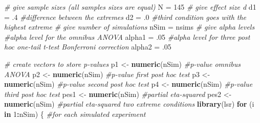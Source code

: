 \documentclass[]{book}
\newenvironment{Shaded}{\begin{snugshade}}{\end{snugshade}}
\newcommand{\CommentTok}[1]{\textcolor[rgb]{0.56,0.35,0.01}{\textit{#1}}}
\newcommand{\ControlFlowTok}[1]{\textcolor[rgb]{0.13,0.29,0.53}{\textbf{#1}}}
\newcommand{\DecValTok}[1]{\textcolor[rgb]{0.00,0.00,0.81}{#1}}
\newcommand{\FloatTok}[1]{\textcolor[rgb]{0.00,0.00,0.81}{#1}}
\newcommand{\KeywordTok}[1]{\textcolor[rgb]{0.13,0.29,0.53}{\textbf{#1}}}
\newcommand{\NormalTok}[1]{#1}
\newcommand{\OperatorTok}[1]{\textcolor[rgb]{0.81,0.36,0.00}{\textbf{#1}}}
\newcommand{\StringTok}[1]{\textcolor[rgb]{0.31,0.60,0.02}{#1}}
\begin{document}
\begin{Shaded}
\begin{Highlighting}[]
\CommentTok{# give sample sizes (all samples sizes are equal)}
\NormalTok{N =}\StringTok{ }\DecValTok{145}
\CommentTok{# give effect size d}
\NormalTok{d1 =}\StringTok{ }\FloatTok{.4} \CommentTok{#difference between the extremes}
\NormalTok{d2 =}\StringTok{ }\FloatTok{.0} \CommentTok{#third condition goes with the highest extreme}
\CommentTok{# give number of simulations}
\NormalTok{nSim =}\StringTok{ }\NormalTok{nsims}
\CommentTok{# give alpha levels}
\CommentTok{#alpha level for the omnibus ANOVA}
\NormalTok{alpha1 =}\StringTok{ }\FloatTok{.05} 
\CommentTok{#alpha level for three post hoc one-tail t-test Bonferroni correction}
\NormalTok{alpha2 =}\StringTok{ }\FloatTok{.05} 

\CommentTok{# create vectors to store p-values}
\NormalTok{p1 <-}\StringTok{ }\KeywordTok{numeric}\NormalTok{(nSim) }\CommentTok{#p-value omnibus ANOVA}
\NormalTok{p2 <-}\StringTok{ }\KeywordTok{numeric}\NormalTok{(nSim) }\CommentTok{#p-value first post hoc test}
\NormalTok{p3 <-}\StringTok{ }\KeywordTok{numeric}\NormalTok{(nSim) }\CommentTok{#p-value second post hoc test}
\NormalTok{p4 <-}\StringTok{ }\KeywordTok{numeric}\NormalTok{(nSim) }\CommentTok{#p-value third post hoc test}
\NormalTok{pes1 <-}\StringTok{ }\KeywordTok{numeric}\NormalTok{(nSim) }\CommentTok{#partial eta-squared}
\NormalTok{pes2 <-}\StringTok{ }\KeywordTok{numeric}\NormalTok{(nSim) }\CommentTok{#partial eta-squared two extreme conditions}
\KeywordTok{library}\NormalTok{(lsr)}
\ControlFlowTok{for}\NormalTok{ (i }\ControlFlowTok{in} \DecValTok{1}\OperatorTok{:}\NormalTok{nSim) \{}
\CommentTok{#for each simulated experiment}


\end{Highlighting}
\end{Shaded}
\end{document}
